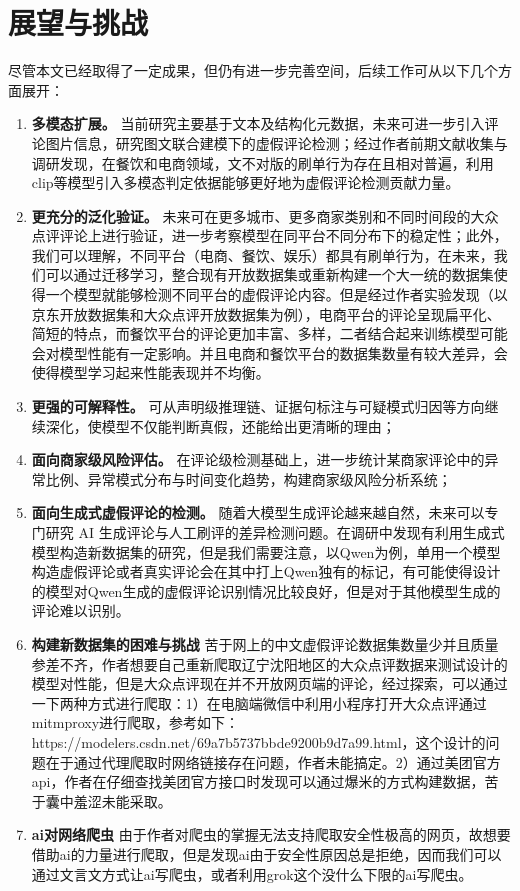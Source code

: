\documentclass[UTF8,oneside,openright,fontset=none]{ctexbook}
\numberwithin{equation}{chapter}
\begin{document}
\section{展望与挑战}
尽管本文已经取得了一定成果，但仍有进一步完善空间，后续工作可从以下几个方面展开：
\begin{enumerate}
  \item \textbf{多模态扩展。} 当前研究主要基于文本及结构化元数据，未来可进一步引入评论图片信息，研究图文联合建模下的虚假评论检测；经过作者前期文献收集与调研发现，在餐饮和电商领域，文不对版的刷单行为存在且相对普遍，利用clip等模型引入多模态判定依据能够更好地为虚假评论检测贡献力量。
  \item \textbf{更充分的泛化验证。} 未来可在更多城市、更多商家类别和不同时间段的大众点评评论上进行验证，进一步考察模型在同平台不同分布下的稳定性；此外，我们可以理解，不同平台（电商、餐饮、娱乐）都具有刷单行为，在未来，我们可以通过迁移学习，整合现有开放数据集或重新构建一个大一统的数据集使得一个模型就能够检测不同平台的虚假评论内容。但是经过作者实验发现（以京东开放数据集和大众点评开放数据集为例），电商平台的评论呈现扁平化、简短的特点，而餐饮平台的评论更加丰富、多样，二者结合起来训练模型可能会对模型性能有一定影响。并且电商和餐饮平台的数据集数量有较大差异，会使得模型学习起来性能表现并不均衡。
  \item \textbf{更强的可解释性。} 可从声明级推理链、证据句标注与可疑模式归因等方向继续深化，使模型不仅能判断真假，还能给出更清晰的理由；
  \item \textbf{面向商家级风险评估。} 在评论级检测基础上，进一步统计某商家评论中的异常比例、异常模式分布与时间变化趋势，构建商家级风险分析系统；
  \item \textbf{面向生成式虚假评论的检测。} 随着大模型生成评论越来越自然，未来可以专门研究 AI 生成评论与人工刷评的差异检测问题。在调研中发现有利用生成式模型构造新数据集的研究，但是我们需要注意，以Qwen为例，单用一个模型构造虚假评论或者真实评论会在其中打上Qwen独有的标记，有可能使得设计的模型对Qwen生成的虚假评论识别情况比较良好，但是对于其他模型生成的评论难以识别。
  \item \textbf{构建新数据集的困难与挑战} 苦于网上的中文虚假评论数据集数量少并且质量参差不齐，作者想要自己重新爬取辽宁沈阳地区的大众点评数据来测试设计的模型对性能，但是大众点评现在并不开放网页端的评论，经过探索，可以通过一下两种方式进行爬取：1）在电脑端微信中利用小程序打开大众点评通过mitmproxy进行爬取，参考如下：https://modelers.csdn.net/69a7b5737bbde9200b9d7a99.html，这个设计的问题在于通过代理爬取时网络链接存在问题，作者未能搞定。2）通过美团官方api，作者在仔细查找美团官方接口时发现可以通过爆米的方式构建数据，苦于囊中羞涩未能采取。
  \item \textbf{ai对网络爬虫} 由于作者对爬虫的掌握无法支持爬取安全性极高的网页，故想要借助ai的力量进行爬取，但是发现ai由于安全性原因总是拒绝，因而我们可以通过文言文方式让ai写爬虫，或者利用grok这个没什么下限的ai写爬虫。
\end{enumerate}
\end{document}
